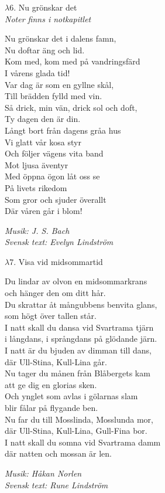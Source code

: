 \documentclass[a6paper,10pt]{article}
\newcommand{\notis}[1]{\begin{flushright}\textit{#1}\end{flushright}}
\begin{document}
\setlength{\oddsidemargin}{-0.47in}
\noindent
\begin{center}
\Large $\lambda6$. Nu grönskar det\\
\small \textit{Noter finns i notkapitlet}
\end{center}
Nu grönskar det i dalens famn,\\
Nu doftar äng och lid.\\
Kom med, kom med på vandringsfärd\\
I vårens glada tid!\\
Var dag är som en gyllne skål,\\
Till brädden fylld med vin.\\
Så drick, min vän, drick sol och doft,\\
Ty dagen den är din.
\vspace{5pt}\\
Långt bort från dagens gråa hus\\
Vi glatt vår kosa styr\\
Och följer vägens vita band\\
Mot ljusa äventyr\\
Med öppna ögon låt oss se\\
På livets rikedom\\
Som gror och sjuder överallt\\
Där våren går i blom! 
\notis{Musik: J. S. Bach\\Svensk text: Evelyn Lindström}

\setlength{\oddsidemargin}{-0.37in}
\noindent
\begin{center}
\Large $\lambda7$. Visa vid midsommartid\\
\end{center}
Du lindar av olvon en midsommarkrans\\
och hänger den om ditt hår.\\
Du skrattar åt mångubbens benvita glans,\\
som högt över tallen står.\\
I natt skall du dansa vid Svartrama tjärn\\
i långdans, i språngdans på glödande järn.\\
I natt är du bjuden av dimman till dans,\\
där Ull-Stina, Kull-Lina går.
\vspace{5pt}\\
Nu tager du månen från Blåbergets kam\\
att ge dig en glorias sken.\\
Och ynglet som avlas i gölarnas slam\\
blir fålar på flygande ben.\\
Nu far du till Mosslinda, Mosslunda mor,\\
där Ull-Stina, Kull-Lina, Gull-Fina bor.\\
I natt skall du somna vid Svartrama damm\\
där natten och mossan är len.
\notis{Musik: Håkan Norlen\\Svensk text: Rune Lindström}
\end{document}
